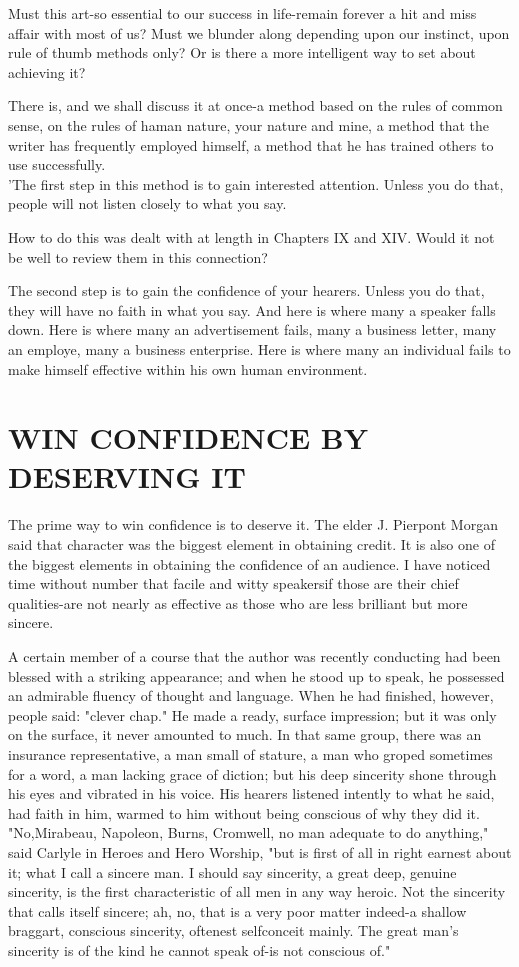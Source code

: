 \documentclass[10pt]{article}
\begin{document}
Must this art-so essential to our success in life-remain forever a hit and miss affair with most of us? Must we blunder along depending upon our instinct, upon rule of thumb methods only? Or is there a more intelligent way to set about achieving it?

There is, and we shall discuss it at once-a method based on the rules of common sense, on the rules of haman nature, your nature and mine, a method that the writer has frequently employed himself, a method that he has trained others to use successfully.\\
'The first step in this method is to gain interested attention. Unless you do that, people will not listen closely to what you say.

How to do this was dealt with at length in Chapters IX and XIV. Would it not be well to review them in this connection?

The second step is to gain the confidence of your hearers. Unless you do that, they will have no faith in what you say. And here is where many a speaker falls down. Here is where many an advertisement fails, many a business letter, many an employe, many a business enterprise. Here is where many an individual fails to make himself effective within his own human environment.

\section*{WIN CONFIDENCE BY DESERVING IT}
The prime way to win confidence is to deserve it. The elder J. Pierpont Morgan said that character was the biggest element in obtaining credit. It is also one of the biggest elements in obtaining the confidence of an audience. I have noticed time without number that facile and witty speakersif those are their chief qualities-are not nearly as effective as those who are less brilliant but more sincere.

A certain member of a course that the author was recently conducting had been blessed with a striking appearance; and when he stood up to speak, he possessed an admirable fluency of thought and language. When he had finished, however, people said: "clever chap." He made a ready, surface impression; but it was only on the surface, it never amounted to much. In that same group, there was an insurance representative, a man small of stature, a man who groped sometimes for a word, a man lacking grace of diction; but his deep sincerity shone through his eyes and vibrated in his voice. His hearers listened intently to what he said,\\
had faith in him, warmed to him without being conscious of why they did it.\\
"No,Mirabeau, Napoleon, Burns, Cromwell, no man adequate to do anything," said Carlyle in Heroes and Hero Worship, "but is first of all in right earnest about it; what I call a sincere man. I should say sincerity, a great deep, genuine sincerity, is the first characteristic of all men in any way heroic. Not the sincerity that calls itself sincere; ah, no, that is a very poor matter indeed-a shallow braggart, conscious sincerity, oftenest selfconceit mainly. The great man's sincerity is of the kind he cannot speak of-is not conscious of."
\end{document}
